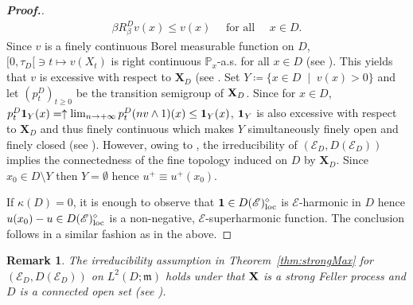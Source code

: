 \documentclass[12pt,a4paper]{article}
\newtheorem{remark}[thm]{Remark}
\newcommand{\m}{\mathfrak{m} }
\newcommand{\loc}{{\rm loc}}
\newcommand{\1}{{\bf 1}}
\begin{document}
\begin{proof}[{\bf Proof.}]
\begin{align*}
\beta R_{\beta}^Dv(x)\leq v(x)\quad \text{ for all }\quad x\in D. 
\end{align*}
Since $v$ is a finely continuous Borel measurable function on $D$, 
$[0,\tau_D[\ni t\mapsto v(X_t)$ is right continuous $\mathbb{P}_x$-a.s. for all $x\in D$ (see \cite[Theorem~A.2.5]{FOT}). This yields that $v$ is excessive with respect to $\textbf{X}_D$ (see \cite[(4.11) Definition and (4.15) Exercise (v)]{Sharpe}. 
Set $Y \coloneqq \{ x \in D \;\mid\; v(x) > 0\}$ and let $(p_t^D)_{t \ge 0}$ be the transition semigroup of ${\bf X}_D$.
Since for $x \in D$, $p_t^D\1_Y(x) = \uparrow\lim_{n \to +\infty}p_t^D(nv \wedge 1)(x) \leq \1_Y(x)$, $\1_Y$ is also excessive with respect to $\textbf{X}_D$ and thus finely continuous which makes $Y$ simultaneously finely open and finely closed (see \cite{Kw:strongmax}). 
However, owing to \cite[Theorem~5.3]{Kw:maximumprinciple}, the irreducibility of $(\mathscr{E}_D, D(\mathscr{E}_D))$ implies  the connectedness of the fine topology induced on $D$ by $\textbf{X}_D$.   
Since $x_0 \in D \setminus Y$ then $Y = \emptyset$ hence $u^+ \equiv u^+(x_0)$. 

If $\kappa(D)=0$, it is enough to observe that $\1 \in 
D(\mathscr{E})_{\loc}^{\diamond}$ is $\mathscr{E}$-harmonic in $D$ hence $u(x_0)- u \in 
D(\mathscr{E})_{\loc}^{\diamond}$ is a non-negative, $\mathscr{E}$-superharmonic function.
The conclusion follows in a similar fashion as in the above. 
\end{proof}
\begin{remark}
{\rm The irreducibility assumption in Theorem~\ref{thm:strongMax} for $(\mathscr{E}_D,D(\mathscr{E}_D))$ on $L^2(D;{\m})$ holds under that ${\bf X}$ is a strong Feller process and 
$D$ is a connected open set (see \cite{Tak:exit}). 
}
\end{remark}
\end{document}
